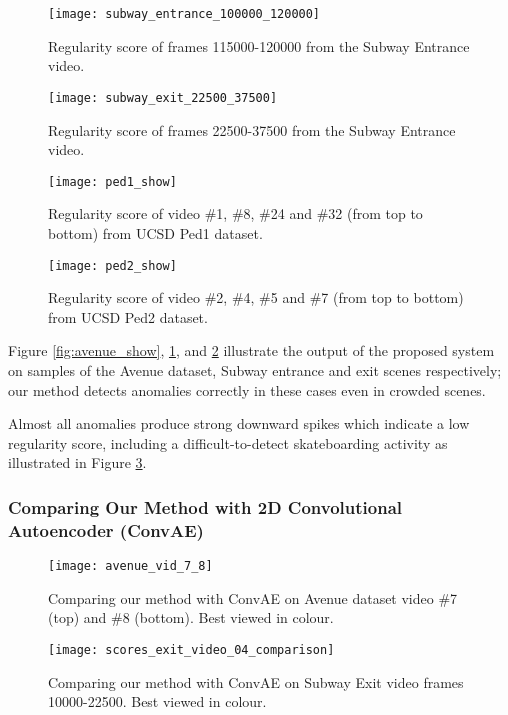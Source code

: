 \documentclass[a4paper]{article}
\begin{document}
\begin{figure}
	\centering
	\texttt{[image: subway\_entrance\_100000\_120000]}
	\caption{Regularity score of frames 115000-120000 from the Subway Entrance video.}
	\label{fig:enter_show}
\end{figure}

\begin{figure}
	\centering
	\texttt{[image: subway\_exit\_22500\_37500]}
	\caption{Regularity score of frames 22500-37500 from the Subway Entrance video.}
	\label{fig:exit_show}
\end{figure}

\begin{figure}
	\centering
	\texttt{[image: ped1\_show]}
	\caption{Regularity score of video \#1, \#8, \#24 and \#32 (from top to bottom) from UCSD Ped1 dataset.}
	\label{fig:ped1_show}
\end{figure}

\begin{figure}
	\centering
	\texttt{[image: ped2\_show]}
	\caption{Regularity score of video \#2, \#4, \#5 and \#7 (from top to bottom) from UCSD Ped2 dataset.}
	\label{fig:ped2_show}
\end{figure}

Figure \ref{fig:avenue_show}, \ref{fig:enter_show}, and \ref{fig:exit_show} illustrate the output of the proposed system on samples of the Avenue dataset, Subway entrance and exit scenes respectively; our method detects anomalies correctly in these cases even in crowded scenes. 

Almost all anomalies produce strong downward spikes which indicate a low regularity score, including a difficult-to-detect skateboarding activity as illustrated in Figure \ref{fig:ped1_show}.

\subsubsection{Comparing Our Method with 2D Convolutional Autoencoder (ConvAE)}

\begin{figure}
	\centering
	\texttt{[image: avenue\_vid\_7\_8]}
	\caption{Comparing our method with ConvAE \cite{hasan2016} on Avenue dataset video \#7 (top) and \#8 (bottom). Best viewed in colour.}
	\label{fig:avenue_compare}
\end{figure}

\begin{figure}
	\centering
	\texttt{[image: scores\_exit\_video\_04\_comparison]}
	\caption{Comparing our method with ConvAE \cite{hasan2016} on Subway Exit video frames 10000-22500. Best viewed in colour.}
	\label{fig:exit_compare}
\end{figure}
\end{document}
